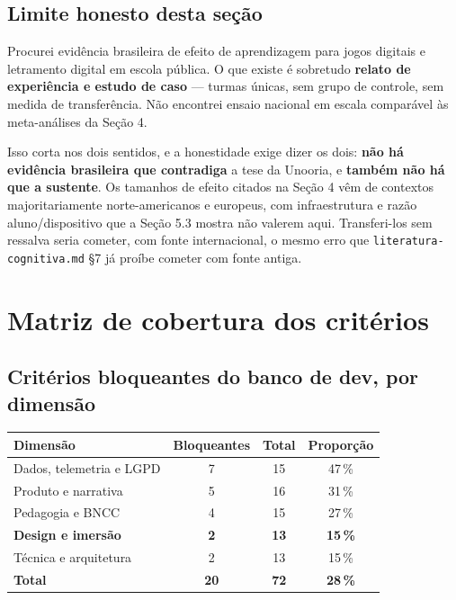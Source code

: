 \documentclass[11pt,a4paper]{article}
\begin{document}
\subsection{Limite honesto desta se\c{c}\~ao}

Procurei evid\^encia brasileira de efeito de aprendizagem para jogos digitais e letramento digital
em escola p\'ublica. O que existe \'e sobretudo \textbf{relato de experi\^encia e estudo de caso}
--- turmas \'unicas, sem grupo de controle, sem medida de transfer\^encia. N\~ao encontrei ensaio
nacional em escala compar\'avel \`as meta-an\'alises da Se\c{c}\~ao 4.

Isso corta nos dois sentidos, e a honestidade exige dizer os dois: \textbf{n\~ao h\'a evid\^encia
brasileira que contradiga} a tese da Unooria, e \textbf{tamb\'em n\~ao h\'a que a sustente}. Os
tamanhos de efeito citados na Se\c{c}\~ao 4 vêm de contextos majoritariamente
norte-americanos e europeus, com infraestrutura e raz\~ao aluno/dispositivo que a
Se\c{c}\~ao 5.3 mostra n\~ao valerem aqui. Transferi-los sem ressalva seria cometer, com fonte
internacional, o mesmo erro que \texttt{literatura-cognitiva.md} \S7 j\'a pro\'ibe cometer com
fonte antiga.

\section{Matriz de cobertura dos crit\'erios}

\subsection{Crit\'erios bloqueantes do banco de dev, por dimens\~ao}

\begin{center}
\begin{tabular}{@{}l c c c@{}}
\toprule
\textbf{Dimens\~ao} & \textbf{Bloqueantes} & \textbf{Total} & \textbf{Propor\c{c}\~ao} \\
\midrule
Dados, telemetria e LGPD      & 7 & 15 & 47\,\% \\
Produto e narrativa           & 5 & 16 & 31\,\% \\
Pedagogia e BNCC              & 4 & 15 & 27\,\% \\
\textbf{Design e imers\~ao}   & \textbf{2} & \textbf{13} & \textbf{15\,\%} \\
T\'ecnica e arquitetura       & 2 & 13 & 15\,\% \\
\midrule
\textbf{Total}                & \textbf{20} & \textbf{72} & \textbf{28\,\%} \\
\bottomrule
\end{tabular}
\end{center}
\end{document}
